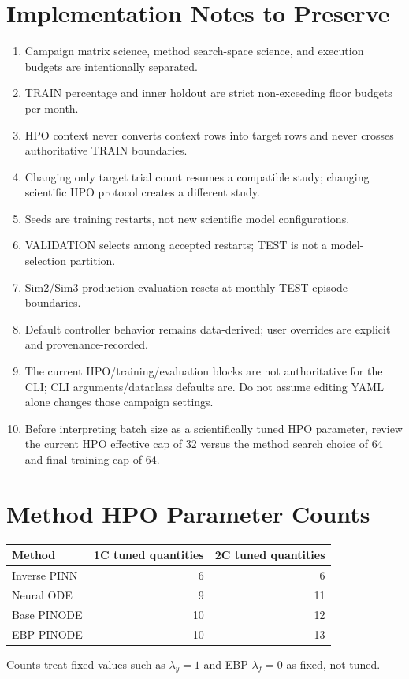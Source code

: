 \documentclass[11pt]{article}
\newcommand{\code}[1]{\texttt{\detokenize{#1}}}
\begin{document}
\section{Implementation Notes to Preserve}
\begin{enumerate}
  \item Campaign matrix science, method search-space science, and execution budgets are intentionally separated.
  \item TRAIN percentage and inner holdout are strict non-exceeding floor budgets per month.
  \item HPO context never converts context rows into target rows and never crosses authoritative TRAIN boundaries.
  \item Changing only target trial count resumes a compatible study; changing scientific HPO protocol creates a different study.
  \item Seeds are training restarts, not new scientific model configurations.
  \item VALIDATION selects among accepted restarts; TEST is not a model-selection partition.
  \item Sim2/Sim3 production evaluation resets at monthly TEST episode boundaries.
  \item Default controller behavior remains data-derived; user overrides are explicit and provenance-recorded.
  \item The current  HPO/training/evaluation blocks are not authoritative for the \code{campaign} CLI; CLI arguments/dataclass defaults are. Do not assume editing YAML alone changes those campaign settings.
  \item Before interpreting batch size as a scientifically tuned HPO parameter, review the current HPO effective cap of 32 versus the method search choice of 64 and final-training cap of 64.
\end{enumerate}

\appendix
\section{Method HPO Parameter Counts}
\begin{table}[h]
\centering
\begin{tabular}{lrr}
\toprule
\textbf{Method} & \textbf{1C tuned quantities} & \textbf{2C tuned quantities} \\
\midrule
Inverse PINN & 6 & 6 \\
Neural ODE & 9 & 11 \\
Base PINODE & 10 & 12 \\
EBP-PINODE & 10 & 13 \\
\bottomrule
\end{tabular}
\end{table}
Counts treat fixed values such as $\lambda_y=1$ and EBP $\lambda_f=0$ as fixed, not tuned.
\end{document}
